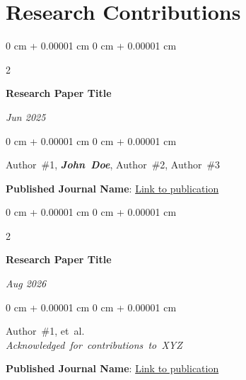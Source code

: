 \documentclass[10pt, letterpaper]{article}
\newenvironment{onecolentry}{
    \begin{adjustwidth}{
        0 cm + 0.00001 cm
    }{
        0 cm + 0.00001 cm
    }
}{
    \end{adjustwidth}
} %
\newenvironment{twocolentry}[2][]{
    \onecolentry
    \def\secondColumn{#2}
    \setcolumnwidth{\fill, 4.5 cm}
    \begin{paracol}{2}
}{
    \switchcolumn \raggedleft \secondColumn
    \end{paracol}
    \endonecolentry
} %
\begin{document}
    \section{Research Contributions}
        \begin{samepage}
            \begin{twocolentry}{
                \textit{Jun 2025}
            }
                \textbf{Research Paper Title}
            \end{twocolentry}

            
            \begin{onecolentry}
                \mbox{Author \#1}, \mbox{\textbf{\textit{John Doe}}}, \mbox{Author \#2}, \mbox{Author \#3}

                
                \textbf{Published Journal Name}: \underline{Link to publication} 
        \end{onecolentry}
        \end{samepage}
        
        \vspace{0.15 cm}

        \begin{samepage}
            \begin{twocolentry}{
                \textit{Aug 2026}
            }
                \textbf{Research Paper Title}
            \end{twocolentry}
            
            \begin{onecolentry}
              \mbox{Author \#1}, \mbox{et al.}\\
              \mbox{\textit{Acknowledged for contributions to XYZ}}
                
                \textbf{Published Journal Name}: \underline{Link to publication} 
        \end{onecolentry}
        \end{samepage}
\end{document}

